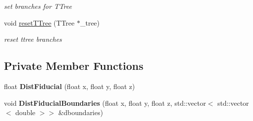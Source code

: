 \begin{DoxyCompactItemize}
\begin{DoxyCompactList}\small\item\em set branches for T\-Tree \end{DoxyCompactList}\item 
\hypertarget{classanalysis_1_1ContainmentAnalysis_abf05f474025861ada4b8ef1299bd24ff}{void \hyperlink{classanalysis_1_1ContainmentAnalysis_abf05f474025861ada4b8ef1299bd24ff}{reset\-T\-Tree} (T\-Tree $\ast$\-\_\-tree)}\label{classanalysis_1_1ContainmentAnalysis_abf05f474025861ada4b8ef1299bd24ff}

\begin{DoxyCompactList}\small\item\em reset ttree branches \end{DoxyCompactList}\end{DoxyCompactItemize}
\subsection*{Private Member Functions}
\begin{DoxyCompactItemize}
\item 
\hypertarget{classanalysis_1_1ContainmentAnalysis_af1ae4a6e17c26624f1ffc789a1a28370}{float {\bfseries Dist\-Fiducial} (float x, float y, float z)}\label{classanalysis_1_1ContainmentAnalysis_af1ae4a6e17c26624f1ffc789a1a28370}

\item 
\hypertarget{classanalysis_1_1ContainmentAnalysis_a403e7651d9e20b4f672232e05a967472}{void {\bfseries Dist\-Fiducial\-Boundaries} (float x, float y, float z, std\-::vector$<$ std\-::vector$<$ double $>$$>$ \&dboundaries)}\label{classanalysis_1_1ContainmentAnalysis_a403e7651d9e20b4f672232e05a967472}

\end{DoxyCompactItemize}
